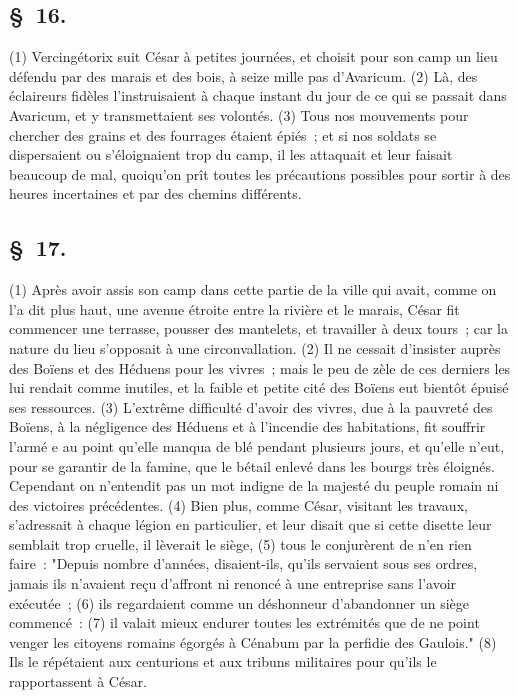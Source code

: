 \documentclass[french,twoside]{book} %
\begin{document}
\subsection[{§ 16.}]{ \textsc{§ 16.} }
\noindent (1) Vercingétorix suit César à petites journées, et choisit pour son camp un lieu défendu par des marais et des bois, à seize mille pas d’Avaricum. (2) Là, des éclaireurs fidèles l’instruisaient à chaque instant du jour de ce qui se passait dans Avaricum, et y transmettaient ses volontés. (3) Tous nos mouvements pour chercher des grains et des fourrages étaient épiés ; et si nos soldats se dispersaient ou s’éloignaient trop du camp, il les attaquait et leur faisait beaucoup de mal, quoiqu’on prît toutes les précautions possibles pour sortir à des heures incertaines et par des chemins différents.
\subsection[{§ 17.}]{ \textsc{§ 17.} }
\noindent (1) Après avoir assis son camp dans cette partie de la ville qui avait, comme on l’a dit plus haut, une avenue étroite entre la rivière et le marais, César fit commencer une terrasse, pousser des mantelets, et travailler à deux tours ; car la nature du lieu s’opposait à une circonvallation. (2) Il ne cessait d’insister auprès des Boïens et des Héduens pour les vivres ; mais le peu de zèle de ces derniers les lui rendait comme inutiles, et la faible et petite cité des Boïens eut bientôt épuisé ses ressources. (3) L'extrême difficulté d’avoir des vivres, due à la pauvreté des Boïens, à la négligence des Héduens et à l’incendie des habitations, fit souffrir l’armé e au point qu’elle manqua de blé pendant plusieurs jours, et qu’elle n’eut, pour se garantir de la famine, que le bétail enlevé dans les bourgs très éloignés. Cependant on n’entendit pas un mot indigne de la majesté du peuple romain ni des victoires précédentes. (4) Bien plus, comme César, visitant les travaux, s’adressait à chaque légion en particulier, et leur disait que si cette disette leur semblait trop cruelle, il lèverait le siège, (5) tous le conjurèrent de n’en rien faire : "Depuis nombre d’années, disaient-ils, qu’ils servaient sous ses ordres, jamais ils n’avaient reçu d’affront ni renoncé à une entreprise sans l’avoir exécutée ; (6) ils regardaient comme un déshonneur d’abandonner un siège commencé : (7) il valait mieux endurer toutes les extrémités que de ne point venger les citoyens romains égorgés à Cénabum par la perfidie des Gaulois." (8) Ils le répétaient aux centurions et aux tribuns militaires pour qu’ils le rapportassent à César.
\end{document}
